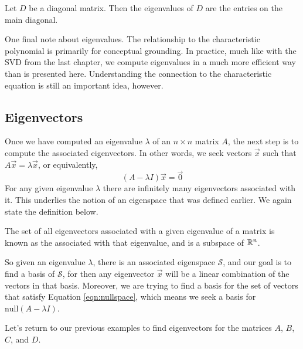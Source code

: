 \documentclass{ximera}
\begin{document}
    
\begin{corollary}\label{th:eigdiag}
Let $D$ be a diagonal matrix.  Then the eigenvalues of $D$ are the entries on the main diagonal.
\end{corollary}
    
\begin{remark}
    One final note about eigenvalues. The relationship to the characteristic polynomial is primarily for conceptual grounding. In practice, much like with the SVD from the last chapter, we compute eigenvalues in a much more efficient way than is presented here. Understanding the connection to the characteristic equation is still an important idea, however.
\end{remark}


    
\subsection*{Eigenvectors}
Once we have computed an eigenvalue $\lambda$ of an $n \times n$ matrix $A$, the next step is to compute the associated eigenvectors.  In other words, we seek vectors $\vec{x}$ such that $A\vec{x}=\lambda \vec{x}$, or equivalently,
\begin{equation}\label{eqn:nullspace}
    (A-\lambda I) \vec{x}=\vec{0}  
\end{equation}
For any given eigenvalue $\lambda$ there are infinitely many eigenvectors associated with it. This underlies the notion of an eigenspace that was defined earlier. We again state the definition below.

    
\begin{definition}\label{def:eigspace}
The set of all eigenvectors associated with a given eigenvalue of a matrix is known as the  associated with that eigenvalue, and is a subspace of $\mathbb{R}^n$.
\end{definition}
    
So given an eigenvalue $\lambda$, there is an associated eigenspace $\mathcal{S}$, and our goal is to find a basis of $\mathcal{S}$, for then any eigenvector $\vec{x}$ will be a linear combination of the vectors in that basis.  Moreover, we are trying to find a basis for the set of vectors that satisfy Equation \ref{eqn:nullspace}, which means we seek a basis for $\mbox{null}(A-\lambda I)$. 
    
Let's return to our previous examples to find eigenvectors for the matrices $A$, $B$, $C$, and $D$.
    
\end{document}
